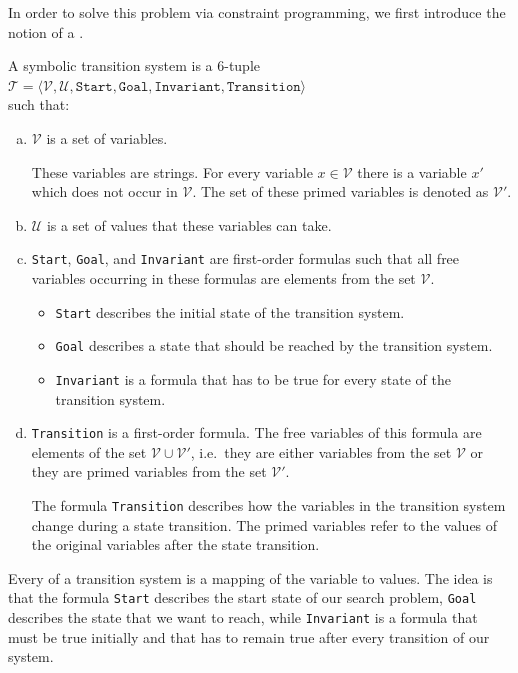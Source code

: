 In order to solve this problem via constraint programming, we first introduce the notion of a
.

\begin{Definition}
  A symbolic transition system is a 6-tuple
  \\[0.2cm]
  \hspace*{1.3cm}
  $\mathcal{T} = \langle \mathcal{V}, \mathcal{U}, \mathtt{Start}, \mathtt{Goal}, \mathtt{Invariant}, \mathtt{Transition} \rangle$
  \\[0.2cm]
  such that:
  \begin{enumerate}[(a)]
  \item $\mathcal{V}$ is a set of variables.

        These variables are strings.  For every variable $x \in \mathcal{V}$ there is a 
        variable $x'$ which does not occur in $\mathcal{V}$.  The set of these primed variables is denoted as
        $\mathcal{V}'$.
  \item $\mathcal{U}$ is a set of values that these variables can take.
  \item \texttt{Start}, \texttt{Goal}, and \texttt{Invariant} are first-order formulas such that all free
         variables occurring in these formulas are elements from the set $\mathcal{V}$.
         \begin{itemize}
         \item \texttt{Start} describes the initial state of the transition system.
         \item \texttt{Goal} describes a state that should be reached by the transition system.
         \item \texttt{Invariant} is a formula that has to be true for every state of the transition system.
         \end{itemize}
  \item \texttt{Transition} is a first-order formula.  The free variables of this formula are elements of
        the set $\mathcal{V} \cup \mathcal{V}'$, i.e.~they are either variables from the set $\mathcal{V}$
        or they are primed variables from the set $\mathcal{V}'$.

        The formula \texttt{Transition} describes how the variables in the transition system change during a
        state transition.  The primed variables refer to the values of the original variables after the
        state transition.  \eox
  \end{enumerate}
\end{Definition}
Every  of a transition system is a mapping of the variable to values.
The idea is that the formula \texttt{Start} describes the start state of our search problem, \texttt{Goal}
describes the state that we want to reach, while \texttt{Invariant} is a formula that must be true initially
and that has to remain true after every transition of our system.

